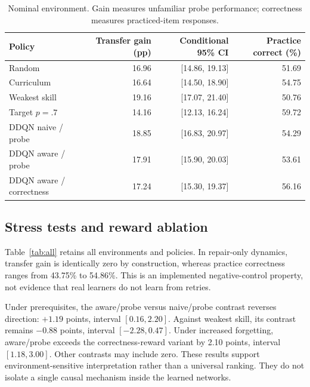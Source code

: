 \documentclass[11pt,a4paper]{article}
\begin{document}
\begin{table}[ht]\centering\small
\begin{tabular}{lrrr}\toprule
Policy & Transfer gain (pp) & Conditional 95\% CI & Practice correct (\%)\\\midrule
Random & 16.96 & [14.86, 19.13] & 51.69\\
Curriculum & 16.64 & [14.50, 18.90] & 54.75\\
Weakest skill & 19.16 & [17.07, 21.40] & 50.76\\
Target $p=.7$ & 14.16 & [12.13, 16.24] & 59.72\\
DDQN naive / probe & 18.85 & [16.83, 20.97] & 54.29\\
DDQN aware / probe & 17.91 & [15.90, 20.03] & 53.61\\
DDQN aware / correctness & 17.24 & [15.30, 19.37] & 56.16\\\bottomrule
\end{tabular}
\caption{Nominal environment. Gain measures unfamiliar probe performance; correctness measures practiced-item responses.}\label{tab:nominal}
\end{table}

\subsection{Stress tests and reward ablation}
Table~\ref{tab:all} retains all environments and policies. In repair-only dynamics, transfer gain is identically zero by construction, whereas practice correctness ranges from 43.75\% to 54.86\%. This is an implemented negative-control property, not evidence that real learners do not learn from retries.

Under prerequisites, the aware/probe versus naive/probe contrast reverses direction: $+1.19$ points, interval $[0.16,2.20]$. Against weakest skill, its contrast remains $-0.88$ points, interval $[-2.28,0.47]$. Under increased forgetting, aware/probe exceeds the correctness-reward variant by 2.10 points, interval $[1.18,3.00]$. Other contrasts may include zero. These results support environment-sensitive interpretation rather than a universal ranking. They do not isolate a single causal mechanism inside the learned networks.
\end{document}

